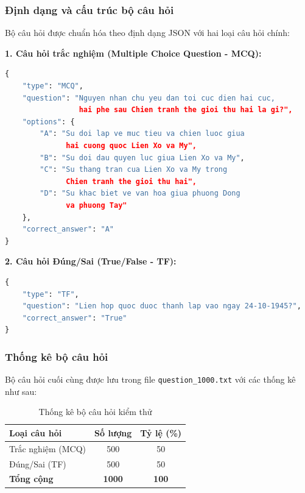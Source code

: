 \subsubsection{Định dạng và cấu trúc bộ câu hỏi}

Bộ câu hỏi được chuẩn hóa theo định dạng JSON với hai loại câu hỏi chính:

\textbf{1. Câu hỏi trắc nghiệm (Multiple Choice Question - MCQ):}
\begin{lstlisting}[language=Python, caption={Định dạng câu hỏi trắc nghiệm MCQ}]
{
    "type": "MCQ",
    "question": "Nguyen nhan chu yeu dan toi cuc dien hai cuc, 
                 hai phe sau Chien tranh the gioi thu hai la gi?",
    "options": {
        "A": "Su doi lap ve muc tieu va chien luoc giua 
              hai cuong quoc Lien Xo va My",
        "B": "Su doi dau quyen luc giua Lien Xo va My",
        "C": "Su thang tran cua Lien Xo va My trong 
              Chien tranh the gioi thu hai",
        "D": "Su khac biet ve van hoa giua phuong Dong 
              va phuong Tay"
    },
    "correct_answer": "A"
}
\end{lstlisting}

\textbf{2. Câu hỏi Đúng/Sai (True/False - TF):}
\begin{lstlisting}[language=Python, caption={Định dạng câu hỏi Đúng/Sai}]
{
    "type": "TF",
    "question": "Lien hop quoc duoc thanh lap vao ngay 24-10-1945?",
    "correct_answer": "True"
}
\end{lstlisting}

\subsubsection{Thống kê bộ câu hỏi}

Bộ câu hỏi cuối cùng được lưu trong file \texttt{question\_1000.txt} với các thống kê như sau:

\begin{table}[H]
\centering
\caption{Thống kê bộ câu hỏi kiểm thử}
\label{tab:question-stats}
\begin{tabular}{|l|c|c|}
\hline
\textbf{Loại câu hỏi} & \textbf{Số lượng} & \textbf{Tỷ lệ (\%)} \\
\hline
Trắc nghiệm (MCQ) & 500 & 50 \\
Đúng/Sai (TF) & 500 & 50 \\
\hline
\textbf{Tổng cộng} & \textbf{1000} & \textbf{100} \\
\hline
\end{tabular}
\end{table}

